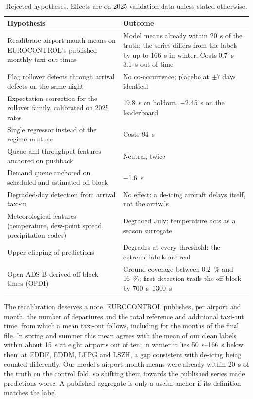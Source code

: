 \documentclass[11pt,a4paper]{article}
\begin{document}
\begin{table}[t]
\centering
\caption{Rejected hypotheses. Effects are on 2025 validation data unless
stated otherwise.}
\label{tab:negative}
\begin{tabular}{p{7.2cm}p{7.2cm}}
\toprule
Hypothesis & Outcome \\
\midrule
Recalibrate airport-month means on EUROCONTROL's published monthly taxi-out
times & Model means already within \SI{20}{\second} of the truth; the series
differs from the labels by up to \SI{166}{\second} in winter. Costs
\SIrange{0.7}{3.1}{\second} out of time \\
Flag rollover defects through arrival defects on the same night & No
co-occurrence; placebo at \(\pm 7\) days identical \\
Expectation correction for the rollover family, calibrated on 2025 rates &
\SI{+19.8}{\second} on holdout, \SI{-2.45}{\second} on the leaderboard \\
Single regressor instead of the regime mixture & Costs \SI{94}{\second} \\
Queue and throughput features anchored on pushback & Neutral, twice \\
Demand queue anchored on scheduled and estimated off-block & \SI{-1.6}{\second} \\
Degraded-day detection from arrival taxi-in & No effect: a de-icing aircraft
delays itself, not the arrivals \\
Meteorological features (temperature, dew-point spread, precipitation codes)
& Degraded July: temperature acts as a season surrogate \\
Upper clipping of predictions & Degrades at every threshold: the extreme
labels are real \\
Open ADS-B derived off-block times (OPDI) & Ground coverage between
\SI{0.2}{\percent} and \SI{16}{\percent}; first detection trails the off-block
by \SIrange{700}{1300}{\second} \\
\bottomrule
\end{tabular}
\end{table}

The recalibration deserves a note. EUROCONTROL publishes, per airport and
month, the number of departures and the total reference and additional
taxi-out time, from which a mean taxi-out follows, including for the months of
the final file. In spring and summer this mean agrees with the mean of our
clean labels within about \SI{15}{\second} at eight airports out of ten; in
winter it lies \SIrange{50}{166}{\second} below them
at EDDF, EDDM, LFPG and LSZH, a gap consistent with de-icing being counted
differently. Our model's airport-month means were already within
\SI{20}{\second} of the truth on the control fold, so shifting them towards
the published series made predictions worse. A published aggregate is only a
useful anchor if its definition matches the label.
\end{document}
